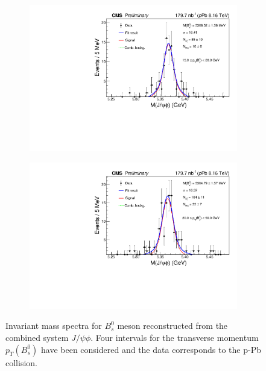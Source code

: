 \begin{figure}[htp!]
\begin{subfigure}[b]{0.475\textwidth}
		\includegraphics[width=\textwidth]{MainContent/Figs/mass/mass_BsFit_ptbins_15_20.PDF}
		\caption{}
	\end{subfigure}
	\hfill
	\begin{subfigure}[b]{0.475\textwidth}
		\centering
		\includegraphics[width=\textwidth]{MainContent/Figs/mass/mass_BsFit_ptbins_20_50.PDF}
		\caption{}%
	\end{subfigure}
	\caption{Invariant mass spectra for $B^0_s$ meson reconstructed from the combined system $J/\psi \phi$. Four intervals for the transverse momentum $p_T(B^0_s)$ have been considered and the data corresponds to the p-Pb collision.}
	\label{fig:mass_ptbins}
	
\end{figure}

